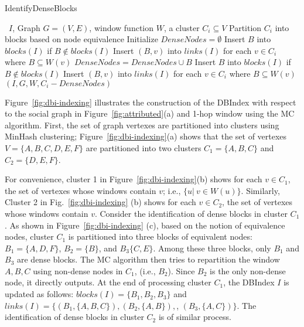 \begin{algorithm}
\caption{IdentifyDenseBlocks}
\begin{algorithmic}[1] \small
\Require \DBIndex\ $I$, Graph $G=(V,E)$, window function $W$, a cluster $C_i \subseteq V$
\State Partition $C_i$ into blocks based on node equivalence
\State Initialize $DenseNodes = \emptyset$
	\State Insert $B$ into $blocks(I)$ if $B \not\in blocks(I)$
	\State Insert $(B,v)$ into $links(I)$ for each $v \in C_i$ where $B \subseteq W(v)$
	\State $DenseNodes = DenseNodes \cup B$
\EndFor
{}
		\State Insert $B$ into $blocks(I)$ if $B \not\in blocks(I)$
		\State Insert $(B,v)$ into $links(I)$ for each $v \in C_i$ where $B \subseteq W(v)$
	\EndFor
{}
		 $(I,G,W,C_i - DenseNodes)$
	\EndIf
\EndIf
\end{algorithmic}
\label{algo:identify}
\end{algorithm}

Figure~\ref{fig:dbi-indexing} 
illustrates the construction of the DBIndex with respect to the social graph in 
Figure~\ref{fig:attributed}(a) and 1-hop window using the MC algorithm.
First, the set of graph vertexes are partitioned into clusters using MinHash clustering;
Figure~\ref{fig:dbi-indexing}(a)
shows that the set of vertexes $V = \{A, B, C, D, E, F \}$ are partitioned into two clusters $C_1=\{A, B, C\}$ and $C_2=\{D, E, F\}$. 

For convenience, cluster 1 in 
Figure~\ref{fig:dbi-indexing}(b) shows for each $v \in C_1$, the set of vertexes whose windows contain $v$;
i.e., $\{u |\ v \in W(u)\}$.
Similarly, Cluster 2 in Fig.~\ref{fig:dbi-indexing} (b)
shows for each $v \in C_2$, the set of vertexes whose windows contain $v$.
Consider the identification of dense blocks in cluster $C_1$.
As shown in Figure~\ref{fig:dbi-indexing} (c), based on the notion of equivalence nodes,
cluster $C_1$ is partitioned into three blocks of equivalent nodes:
$B_1=\{A,D,F\}$, $B_2=\{B\}$, and $B_3\{C,E\}$.
Among these three blocks, only
$B_1$ and $B_3$ are dense blocks.
The MC algorithm then tries to repartition the window $A,B,C$ using non-dense nodes in $C_1$,
(i.e., $B_2$). Since $B_2$ is the only non-dense node, it directly outputs.
At the end of processing cluster $C_1$,
the DBIndex $I$ is updated as follows:
$blocks(I) = \{B_1, B_2, B_3\}$ 
and
$links(I) = \{ (B_1,\{A,B,C\}), (B_2, \{A,B\}),$, $(B_3, \{A,C\}) \}$. The identification of dense blocks in cluster $C_2$ 
is of similar process.

